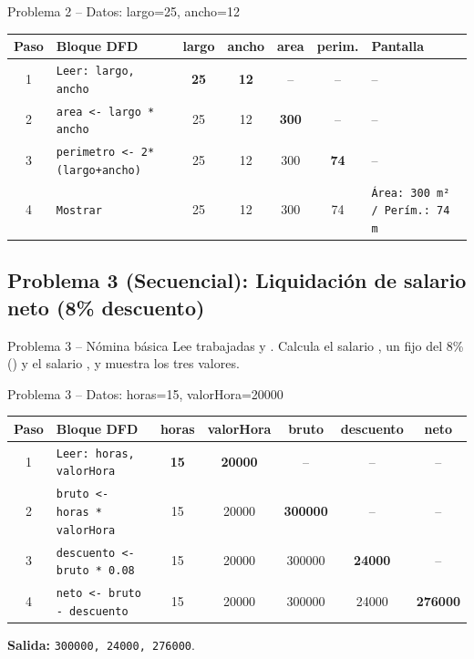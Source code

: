 \documentclass[11pt,letterpaper]{article}
\begin{document}
\begin{pruebaescritorio}{Problema 2 -- Datos: largo=25, ancho=12}
\begin{center}
\scriptsize
\setlength{\tabcolsep}{3.5pt}
\begin{tabular}{c l c c c c l}
  \toprule
  \textbf{Paso} & \textbf{Bloque DFD} & \textbf{largo} & \textbf{ancho} & \textbf{area} & \textbf{perim.} & \textbf{Pantalla} \\
  \midrule
  1 & \texttt{Leer: largo, ancho} & \textbf{25} & \textbf{12} & -- & -- & -- \\
  2 & \texttt{area <- largo * ancho} & 25 & 12 & \textbf{300} & -- & -- \\
  3 & \texttt{perimetro <- 2*(largo+ancho)} & 25 & 12 & 300 & \textbf{74} & -- \\
  4 & \texttt{Mostrar} & 25 & 12 & 300 & 74 & \texttt{Área: 300 m² / Perím.: 74 m} \\
  \bottomrule
\end{tabular}
\end{center}
\end{pruebaescritorio}

\subsection{Problema 3 (Secuencial): Liquidación de salario neto (8\% descuento)}
\begin{analisis}{Problema 3 -- Nómina básica}
Lee  trabajadas y . Calcula el salario , un  fijo del 8\% () y el salario , y muestra los tres valores.
\end{analisis}


\begin{pruebaescritorio}{Problema 3 -- Datos: horas=15, valorHora=20000}
\begin{center}
\footnotesize
\begin{tabular}{c l c c c c c}
  \toprule
  \textbf{Paso} & \textbf{Bloque DFD} & \textbf{horas} & \textbf{valorHora} & \textbf{bruto} & \textbf{descuento} & \textbf{neto} \\
  \midrule
  1 & \texttt{Leer: horas, valorHora} & \textbf{15} & \textbf{20000} & -- & -- & -- \\
  2 & \texttt{bruto <- horas * valorHora} & 15 & 20000 & \textbf{300000} & -- & -- \\
  3 & \texttt{descuento <- bruto * 0.08} & 15 & 20000 & 300000 & \textbf{24000} & -- \\
  4 & \texttt{neto <- bruto - descuento} & 15 & 20000 & 300000 & 24000 & \textbf{276000} \\
  \bottomrule
\end{tabular}
\end{center}
\textbf{Salida:} \texttt{300000, 24000, 276000}.
\end{pruebaescritorio}
\end{document}
